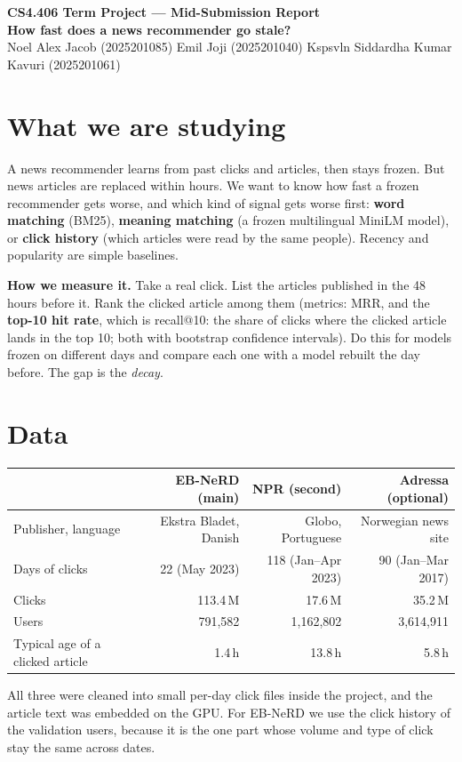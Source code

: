\documentclass[10pt,a4paper]{article}
\begin{document}
\begin{center}
{\Large\textbf{CS4.406 Term Project --- Mid-Submission Report}}\\[2pt]
{\large\textbf{How fast does a news recommender go stale?}}\\[2pt]
{\normalsize Noel Alex Jacob (2025201085) \quad Emil Joji (2025201040) \quad Kspsvln Siddardha Kumar Kavuri (2025201061)}
\end{center}

\section{What we are studying}
A news recommender learns from past clicks and articles, then stays frozen. But news articles are replaced within hours.
We want to know how fast a frozen recommender gets worse, and which kind of signal gets worse first:
\textbf{word matching} (BM25), \textbf{meaning matching} (a frozen multilingual MiniLM model), or \textbf{click history}
(which articles were read by the same people). Recency and popularity are simple baselines.

\textbf{How we measure it.} Take a real click. List the articles published in the 48 hours before it. Rank the clicked article among them (metrics: MRR, and the \textbf{top-10 hit rate}, which is recall@10: the share of clicks where the clicked article lands in the top 10; both with bootstrap confidence intervals).
Do this for models frozen on different days and compare each one with a model rebuilt the day before. The gap is the \emph{decay}.

\section{Data}
\begin{center}
\small
\setlength{\tabcolsep}{5pt}
\begin{tabular}{@{}lrrr@{}}
\toprule
 & \textbf{EB-NeRD} (main) & \textbf{NPR} (second) & \textbf{Adressa} (optional)\\
\midrule
Publisher, language & Ekstra Bladet, Danish & Globo, Portuguese & Norwegian news site\\
Days of clicks & 22 (May 2023) & 118 (Jan--Apr 2023) & 90 (Jan--Mar 2017)\\
Clicks & 113.4\,M & 17.6\,M & 35.2\,M\\
Users & 791,582 & 1,162,802 & 3,614,911\\
Typical age of a clicked article & 1.4\,h & 13.8\,h & 5.8\,h\\
\bottomrule
\end{tabular}
\end{center}
All three were cleaned into small per-day click files inside the project, and the article text was embedded on the GPU.
For EB-NeRD we use the click history of the validation users, because it is the one part whose volume and type of click stay the same across dates.
\end{document}
